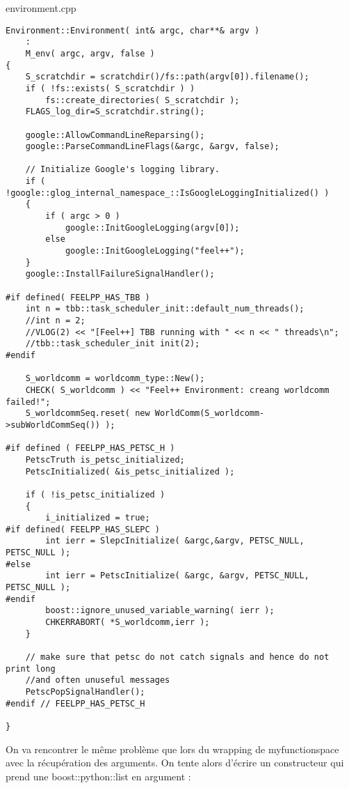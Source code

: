 \documentclass[12pt]{article}
\begin{document}
environment.cpp
\begin{lstlisting}
Environment::Environment( int& argc, char**& argv )
    :
    M_env( argc, argv, false )
{
    S_scratchdir = scratchdir()/fs::path(argv[0]).filename();
    if ( !fs::exists( S_scratchdir ) )
        fs::create_directories( S_scratchdir );
    FLAGS_log_dir=S_scratchdir.string();

    google::AllowCommandLineReparsing();
    google::ParseCommandLineFlags(&argc, &argv, false);

    // Initialize Google's logging library.
    if ( !google::glog_internal_namespace_::IsGoogleLoggingInitialized() )
    {
        if ( argc > 0 )
            google::InitGoogleLogging(argv[0]);
        else
            google::InitGoogleLogging("feel++");
    }
    google::InstallFailureSignalHandler();

#if defined( FEELPP_HAS_TBB )
    int n = tbb::task_scheduler_init::default_num_threads();
    //int n = 2;
    //VLOG(2) << "[Feel++] TBB running with " << n << " threads\n";
    //tbb::task_scheduler_init init(2);
#endif

    S_worldcomm = worldcomm_type::New();
    CHECK( S_worldcomm ) << "Feel++ Environment: creang worldcomm failed!";
    S_worldcommSeq.reset( new WorldComm(S_worldcomm->subWorldCommSeq()) );

#if defined ( FEELPP_HAS_PETSC_H )
    PetscTruth is_petsc_initialized;
    PetscInitialized( &is_petsc_initialized );

    if ( !is_petsc_initialized )
    {
        i_initialized = true;
#if defined( FEELPP_HAS_SLEPC )
        int ierr = SlepcInitialize( &argc,&argv, PETSC_NULL, PETSC_NULL );
#else
        int ierr = PetscInitialize( &argc, &argv, PETSC_NULL, PETSC_NULL );
#endif
        boost::ignore_unused_variable_warning( ierr );
        CHKERRABORT( *S_worldcomm,ierr );
    }

    // make sure that petsc do not catch signals and hence do not print long
    //and often unuseful messages
    PetscPopSignalHandler();
#endif // FEELPP_HAS_PETSC_H

}
\end{lstlisting}

On va rencontrer le même problème que lors du wrapping de myfunctionspace avec la récupération des arguments. On tente alors d'écrire un constructeur qui prend une boost::python::list en argument :
\end{document}
